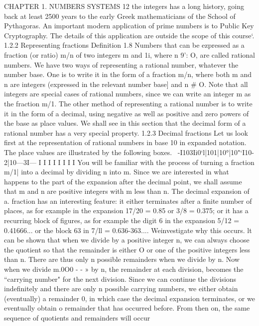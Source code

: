 CHAPTER 1. NUMBERS SYSTEMS 12
the integers has a long history, going back at least 2500 years to the early Greek mathematicians
of the School of Pythagoras. An important modern application of prime numbers is to Public Key
Cryptography. The details of this application are outside the scope of this course‘.
1.2.2 Representing fractions
Deﬁnition 1.8 Numbers that can be ezpressed as a fraction (or ratio) m/n of two integers m and
1i, where n 9’: O, are called rational numbers.
We have two ways of representing a rational number, whatever the number base. One is to write it
in the form of a fraction m/n, where both m and n are integers (expressed in the relevant number
base] and n # O. Note that all integers are special cases of rational numbers, since we can write
an integer m as the fraction m/1.
The other method of representing a rational number is to write it in the form of a decimal, using
negative as well as positive and zero powers of the base as place values. We shall see in this section
that the decimal form of a rational number has a very special property.
1.2.3 Decimal fractions
Let us look first at the representation of rational numbers in base 10 in expanded notation. The
place values are illustrated by the following boxes.
~-I103Ii0‘l|101|10°|10"‘I10-2|10—3I---
I I I I I I I I
You will be familiar with the process of turning a fraction m/1| into a decimal by dividing n into
m. Since we are interested in what happens to the part of the expansion after the decimal point,
we shall assume that m and n are positive integers with m less than n.
The decimal expansion of a. fraction has an interesting feature: it either terminates after a ﬁnite
number of places, as for example in the expansion 17/20 = 0.85 or 3/8 = 0.375; or it has a recurring
block of ﬁgures, as for example the digit 6 in the expansion 5/12 = 0.41666... or the block 63 in
7/ll = 0.636-363.... Weinvestigate why this occurs.
lt can be shown that when we divide by a positive integer n, we can always choose the quotient
so that the remainder is either O or one of the positive integers less than n. There are thus only
n possible remainders when we divide by n. Now when we divide m.0O0 - - » by n, the remainder
at each division, becomes the “carrying number" for the next division. Since we can continue the
divisions indeﬁnitely and there are only n possible carrying numbers, we either obtain (eventually)
a remainder 0, in which case the decimal expansion terminates, or we eventually obtain o remainder
that has occurred before. From then on, the same sequence of quotients and remainders will occur
